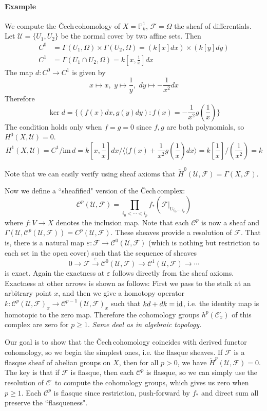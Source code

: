 \documentclass[12pt]{article}
\theoremstyle{plain}
\theoremstyle{definition}
\newcommand{\sU}{\mathcal{U}}
\newcommand{\IP}{\mathbb{P}}
\newcommand{\shC}{\mathscr{C}}
\newcommand{\shF}{\mathscr{F}}
\newcommand{\id}{\rm id}
\newcommand{\<}{\langle}
\renewcommand{\>}{\rangle}
\newcommand{\Ohm}{\Omega}
\newcommand{\sm}{\varepsilon}
\newcommand{\Cech}{\v{C}ech\,}
\newcommand{\im}{\mathrm{im}\,}
\newcommand{\cH}{\check{H}}
\begin{document}
\paragraph{Example} We compute the \Cech cohomology of $X = \IP^1_k$, $\shF = \Ohm$ the sheaf of differentials. Let $\sU = \{ U_1, U_2 \}$ be the normal cover by two affine sets.  Then 
\begin{align*}
C^0 &= \Gamma(U_1, \Ohm) \times \Gamma(U_2, \Ohm) = (k[x] dx) \times (k[y] dy) \\
C^1 &= \Gamma(U_1 \cap U_2, \Ohm) = k[x, \frac{1}{x}] dx 
\end{align*} 
The map $d : C^0 \to C^1$ is given by 
$$ x \mapsto x, \, \, y \mapsto \frac{1}{y}, \, \, dy \mapsto - \frac{1}{x^2} dx $$
Therefore 
$$ \ker d = \{ (f(x) dx, g(y) dy) : f(x) = - \frac{1}{x^2} g(\frac{1}{x}) \}$$
The condition holds only when $f = g = 0$ since $f, g$ are both polynomials, so $H^0(X, \sU) = 0$. 
$$ H^1(X, \sU) = C^1/ \im d = k[x, \frac{1}{x}] dx/ \< (f(x) + \frac{1}{x^2} g(\frac{1}{x})dx \> = k[\frac{1}{x}]/(\frac{1}{x^2}) = k $$

Note that we can easily verify using sheaf axioms that $\cH^0(\sU, \shF) = \Gamma(X, \shF)$. 

Now we define a ``sheafified" version of the \Cech complex: 
$$ \shC^p(\sU, \shF)  =  \prod_{i_0 < \cdots < i_p} f_* (\shF|_{U_{i_0, \cdots, i_p}})$$
where $f : V \to X$ denotes the inclusion map. Note that each $\shC^p$ is now a sheaf and $\Gamma(\sU, \shC^p(\sU, \shF)) = C^p(\sU, \shF)$. These sheaves provide a resolution of $\shF$. That is, there is a natural map $\sm : \shF \to \shC^0(\sU, \shF)$ (which is nothing but restriction to each set in the open cover) such that the sequence of sheaves 
$$ 0 \to \shF \stackrel{\sm}{\to} \shC^0(\sU,\shF) \to \shC^1(\sU,\shF) \to \cdots $$
is exact. Again the exactness at $\sm$ follows directly from the sheaf axioms. Exactness at other arrows is shown as follows: First we pass to the stalk at an arbitrary point $x$, and then we give a homotopy operator $k : \shC^p(\sU, \shF)_x \to \shC^{p - 1}(\sU, \shF)_x$ such that $kd + dk = \id$, i.e. the identity map is homotopic to the zero map. Therefore the cohomology groups $h^p(\shC_x^\cdot)$ of this complex are zero for $p \ge 1$. \textit{Same deal as in algebraic topology.}

Our goal is to show that the \Cech cohomology coincides with derived functor cohomology, so we begin the simplest ones, i.e. the flasque sheaves. If $\shF$ is a flasque sheaf of abelian groups on $X$, then for all $p > 0$, we have $\cH^p(\sU, \shF) = 0$. The key is that if $\shF$ is flasque, then each $\shC^p$ is flasque, so we can simply use the resolution of $\shC^\cdot$ to compute the cohomology groups, which gives us zero when $p \ge 1$. Each $\shC^p$ is flasque since restriction, push-forward by $f_*$ and direct sum all preserve the ``flasqueness". 
\end{document}
